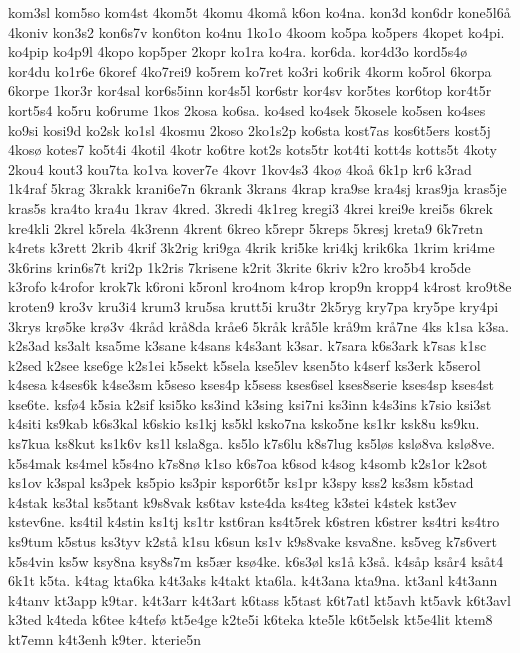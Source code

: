 {kom3sl
kom5so
kom4st
4kom5t
4komu
4kom^^e5
k6on
ko4na.
kon3d
kon6dr
kone5l6^^e5
4koniv
kon3s2
kon6s7v
kon6ton
ko4nu
1ko1o
4koom
ko5pa
ko5pers
4kopet
ko4pi.
ko4pip
ko4p9l
4kopo
kop5per
2kopr
ko1ra
ko4ra.
kor6da.
kor4d3o
kord5s4^^f8
kor4du
ko1r6e
6koref
4ko7rei9
ko5rem
ko7ret
ko3ri
ko6rik
4korm
ko5rol
6korpa
6korpe
1kor3r
kor4sal
kor6s5inn
kor4s5l
kor6str
kor4sv
kor5tes
kor6top
kor4t5r
kort5s4
ko5ru
ko6rume
1kos
2kosa
ko6sa.
ko4sed
ko4sek
5kosele
ko5sen
ko4ses
ko9si
kosi9d
ko2sk
ko1sl
4kosmu
2koso
2ko1s2p
ko6sta
kost7as
kos6t5ers
kost5j
4kos^^f8
kotes7
ko5t4i
4kotil
4kotr
ko6tre
kot2s
kots5tr
kot4ti
kott4s
kotts5t
4koty
2kou4
kout3
kou7ta
ko1va
kover7e
4kovr
1kov4s3
4ko^^f8
4ko^^e5
6k1p
kr6
k3rad
1k4raf
5krag
3krakk
krani6e7n
6krank
3krans
4krap
kra9se
kra4sj
kras9ja
kras5je
kras5s
kra4to
kra4u
1krav
4kred.
3kredi
4k1reg
kregi3
4krei
krei9e
krei5s
6krek
kre4kli
2krel
k5rela
4k3renn
4krent
6kreo
k5repr
5kreps
5kresj
kreta9
6k7retn
k4rets
k3rett
2krib
4krif
3k2rig
kri9ga
4krik
kri5ke
kri4kj
krik6ka
1krim
kri4me
3k6rins
krin6s7t
kri2p
1k2ris
7krisene
k2rit
3krite
6kriv
k2ro
kro5b4
kro5de
k3rofo
k4rofor
krok7k
k6roni
k5ronl
kro4nom
k4rop
krop9n
kropp4
k4rost
kro9t8e
kroten9
kro3v
kru3i4
krum3
kru5sa
krutt5i
kru3tr
2k5ryg
kry7pa
kry5pe
kry4pi
3krys
kr^^f85ke
kr^^f83v
4kr^^e5d
kr^^e58da
kr^^e5e6
5kr^^e5k
kr^^e55le
kr^^e59m
kr^^e57ne
4ks
k1sa
k3sa.
k2s3ad
ks3alt
ksa5me
k3sane
k4sans
k4s3ant
k3sar.
k7sara
k6s3ark
k7sas
k1sc
k2sed
k2see
kse6ge
k2s1ei
k5sekt
k5sela
kse5lev
ksen5to
k4serf
ks3erk
k5serol
k4sesa
k4ses6k
k4se3sm
k5seso
kses4p
k5sess
kses6sel
kses8serie
kses4sp
kses4st
kse6te.
ksf^^f84
k5sia
k2sif
ksi5ko
ks3ind
k3sing
ksi7ni
ks3inn
k4s3ins
k7sio
ksi3st
k4siti
ks9kab
k6s3kal
k6skio
ks1kj
ks5kl
ksko7na
ksko5ne
ks1kr
ksk8u
ks9ku.
ks7kua
ks8kut
ks1k6v
ks1l
ksla8ga.
ks5lo
k7s6lu
k8s7lug
ks5l^^f8s
ksl^^f88va
ksl^^f88ve.
k5s4mak
ks4mel
k5s4no
k7s8n^^f8
k1so
k6s7oa
k6sod
k4sog
k4somb
k2s1or
k2sot
ks1ov
k3spal
ks3pek
ks5pio
ks3pir
kspor6t5r
ks1pr
k3spy
kss2
ks3sm
k5stad
k4stak
ks3tal
ks5tant
k9s8vak
ks6tav
kste4da
ks4teg
k3stei
k4stek
kst3ev
kstev6ne.
ks4til
k4stin
ks1tj
ks1tr
kst6ran
ks4t5rek
k6stren
k6strer
ks4tri
ks4tro
ks9tum
k5stus
ks3tyv
k2st^^e5
k1su
k6sun
ks1v
k9s8vake
ksva8ne.
ks5veg
k7s6vert
k5s4vin
ks5w
ksy8na
ksy8s7m
ks5^^e6r
ks^^f84ke.
k6s3^^f8l
ks1^^e5
k3s^^e5.
k4s^^e5p
ks^^e5r4
ks^^e5t4
6k1t
k5ta.
k4tag
kta6ka
k4t3aks
k4takt
kta6la.
k4t3ana
kta9na.
kt3anl
k4t3ann
k4tanv
kt3app
k9tar.
k4t3arr
k4t3art
k6tass
k5tast
k6t7atl
kt5avh
kt5avk
k6t3avl
k3ted
k4teda
k6tee
k4tef^^f8
kt5e4ge
k2te5i
k6teka
kte5le
k6t5elsk
kt5e4lit
ktem8
kt7emn
k4t3enh
k9ter.
kterie5n
}
